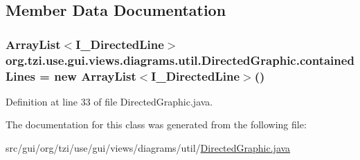 \subsection{Member Data Documentation}
\hypertarget{classorg_1_1tzi_1_1use_1_1gui_1_1views_1_1diagrams_1_1util_1_1_directed_graphic_afd2fe2da90e86206b4cbbe9ed0d30a82}{
\subsubsection[{contained\-Lines}]{\setlength{\rightskip}{0pt plus 5cm}Array\-List$<${\bf I\-\_\-\-Directed\-Line}$>$ org.\-tzi.\-use.\-gui.\-views.\-diagrams.\-util.\-Directed\-Graphic.\-contained\-Lines = new Array\-List$<${\bf I\-\_\-\-Directed\-Line}$>$()\hspace{0.3cm}{\ttfamily [protected]}}}\label{classorg_1_1tzi_1_1use_1_1gui_1_1views_1_1diagrams_1_1util_1_1_directed_graphic_afd2fe2da90e86206b4cbbe9ed0d30a82}


Definition at line 33 of file Directed\-Graphic.\-java.



The documentation for this class was generated from the following file\-:\begin{DoxyCompactItemize}
\item 
src/gui/org/tzi/use/gui/views/diagrams/util/\hyperlink{_directed_graphic_8java}{Directed\-Graphic.\-java}\end{DoxyCompactItemize}
